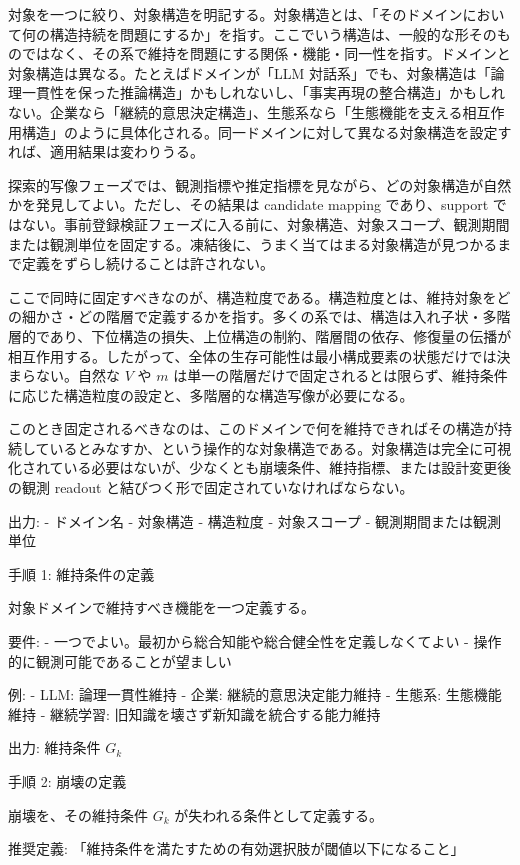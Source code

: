 \documentclass[12pt,a4paper]{article}
\begin{document}
対象を一つに絞り、対象構造を明記する。対象構造とは、「そのドメインにおいて何の構造持続を問題にするか」を指す。ここでいう構造は、一般的な形そのものではなく、その系で維持を問題にする関係・機能・同一性を指す。ドメインと対象構造は異なる。たとえばドメインが「LLM 対話系」でも、対象構造は「論理一貫性を保った推論構造」かもしれないし、「事実再現の整合構造」かもしれない。企業なら「継続的意思決定構造」、生態系なら「生態機能を支える相互作用構造」のように具体化される。同一ドメインに対して異なる対象構造を設定すれば、適用結果は変わりうる。

探索的写像フェーズでは、観測指標や推定指標を見ながら、どの対象構造が自然かを発見してよい。ただし、その結果は candidate mapping であり、support ではない。事前登録検証フェーズに入る前に、対象構造、対象スコープ、観測期間または観測単位を固定する。凍結後に、うまく当てはまる対象構造が見つかるまで定義をずらし続けることは許されない。

ここで同時に固定すべきなのが、構造粒度である。構造粒度とは、維持対象をどの細かさ・どの階層で定義するかを指す。多くの系では、構造は入れ子状・多階層的であり、下位構造の損失、上位構造の制約、階層間の依存、修復量の伝播が相互作用する。したがって、全体の生存可能性は最小構成要素の状態だけでは決まらない。自然な \(V\) や \(m\) は単一の階層だけで固定されるとは限らず、維持条件に応じた構造粒度の設定と、多階層的な構造写像が必要になる。

このとき固定されるべきなのは、このドメインで何を維持できればその構造が持続しているとみなすか、という操作的な対象構造である。対象構造は完全に可視化されている必要はないが、少なくとも崩壊条件、維持指標、または設計変更後の観測 readout と結びつく形で固定されていなければならない。

出力: - ドメイン名 - 対象構造 - 構造粒度 - 対象スコープ - 観測期間または観測単位

手順 1: 維持条件の定義

対象ドメインで維持すべき機能を一つ定義する。

要件: - 一つでよい。最初から総合知能や総合健全性を定義しなくてよい - 操作的に観測可能であることが望ましい

例: - LLM: 論理一貫性維持 - 企業: 継続的意思決定能力維持 - 生態系: 生態機能維持 - 継続学習: 旧知識を壊さず新知識を統合する能力維持

出力: 維持条件 \(G_{k}\)

手順 2: 崩壊の定義

崩壊を、その維持条件 \(G_{k}\) が失われる条件として定義する。

推奨定義: 「維持条件を満たすための有効選択肢が閾値以下になること」
\end{document}
